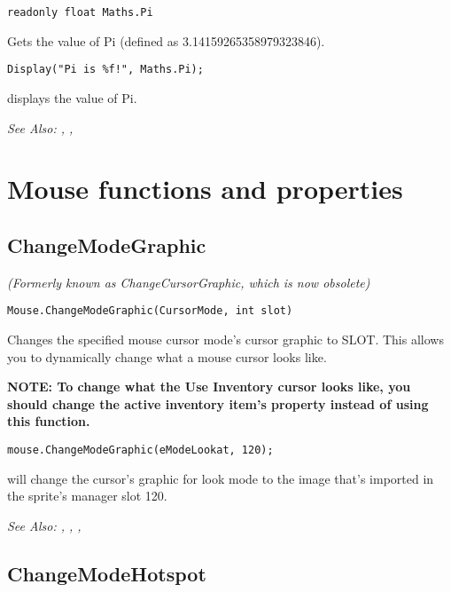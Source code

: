 \begin{verbatim}
readonly float Maths.Pi
\end{verbatim}
Gets the value of Pi (defined as 3.14159265358979323846).

\begin{verbatim}
Display("Pi is %f!", Maths.Pi);
\end{verbatim}
displays the value of Pi.

\it{See Also:} , ,



\section{Mouse functions and properties}%


\subsection{ChangeModeGraphic}\label{Mouse.ChangeModeGraphic}%

\it{(Formerly known as ChangeCursorGraphic, which is now obsolete)}

\begin{verbatim}
Mouse.ChangeModeGraphic(CursorMode, int slot)
\end{verbatim}
Changes the specified mouse cursor mode's cursor graphic to SLOT.
This allows you to dynamically change what a mouse cursor looks like.

\bf{NOTE:} To change what the Use Inventory cursor looks like, you should change
the active inventory item's  property
instead of using this function.

\begin{verbatim}
mouse.ChangeModeGraphic(eModeLookat, 120);
\end{verbatim}
will change the cursor's graphic for look mode to the image that's imported in the sprite's manager slot 120.

\it{See Also:} ,
,
,


\subsection{ChangeModeHotspot}\label{Mouse.ChangeModeHotspot}%

